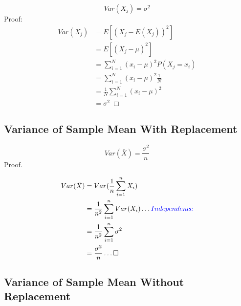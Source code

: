 \documentclass[
]{article}
\begin{document}
\[Var(X_j) = \sigma ^2\] Proof:
\[\begin{aligned} Var(X_j) &= E[(X_j - E(X_j))^2] \\
&= E[(X_j - \mu)^2] \\
&= \sum^{N}_{i=1}(x_i - \mu)^2 P(X_j = x_i) \\
&= \sum^{N}_{i=1}(x_i - \mu)^2 \frac{1}{N} \\
&= \frac{1}{N} \sum_{i=1}^{N} (x_i - \mu)^2 \\
&= \sigma^2 \; \Box
\end{aligned}\]

\hypertarget{variance-of-sample-mean-with-replacement}{%
\subsection{Variance of Sample Mean With
Replacement}\label{variance-of-sample-mean-with-replacement}}

\[Var(\bar{X}) = \frac{\sigma^2}{n}\] Proof.

\[\begin{aligned} 
Var(\bar{X}) &= Var(\frac{1}{n}\sum_{i=1}^n X_i) \\
&=\frac{1}{n^2}\sum_{i=1}^nVar(X_i) \dots \color{blue}{Independence} \\
&= \frac{1}{n^2}\sum_{i=1}^n  \sigma^2 \\
&= \frac{\sigma^2}{n} \dots\Box
\end{aligned}\]

\hypertarget{variance-of-sample-mean-without-replacement}{%
\subsection{Variance of Sample Mean Without
Replacement}\label{variance-of-sample-mean-without-replacement}}
\end{document}
